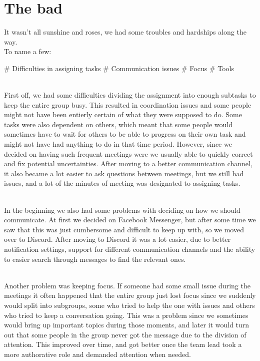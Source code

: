 \documentclass{article}
\begin{document}
\newpage

\section*{The bad}

It wasn't all sunshine and roses, we had some troubles and hardships along the way.
\noindent \\
To name a few:\\

\begin{easylist}[itemize]

# Difficulties in assigning tasks
# Communication issues
# Focus
# Tools

\end{easylist}

\noindent \\
First off, we had some difficulties dividing the assignment into enough subtasks to keep the entire group busy. This resulted in coordination issues and some people might not have been entierly certain of what they were supposed to do. Some tasks were also dependent on others, which meant that some people would sometimes have to wait for others to be able to progress on their own task and might not have had anything to do in that time period. However, since we decided on having such frequent meetings were we usually able to quickly correct and fix potential uncertainties. After moving to a better communication channel, it also became a lot easier to ask questions between meetings, but we still had issues, and a lot of the minutes of meeting was designated to assigning tasks.

\noindent \\
In the beginning we also had some problems with deciding on how we should communicate. At first we decided on Facebook Messenger, but after some time we saw that this was just cumbersome and difficult to keep up with, so we moved over to Discord. After moving to Discord it was a lot easier, due to better notification settings, support for different communication channels and the ability to easier search through messages to find the relevant ones.

\noindent \\
Another problem was keeping focus. If someone had some small issue during the meetings it often happened that the entire group just lost focus since we suddenly would split into subgroups, some who tried to help the one with issues and others who tried to keep a conversation going. This was a problem since we sometimes would bring up important topics during those moments, and later it would turn out that some people in the group never got the message due to the division of attention. This improved over time, and got better once the team lead took a more authorative role and demanded attention when needed.
\end{document}

